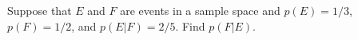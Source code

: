 \documentclass[../main.tex]{subfiles}
\begin{document}
Suppose that $E$ and $F$ are events in a sample space and $p(E) = 1/3$, $p(F) = 1/2$, and $p(E|F) = 2/5$. Find $p(F|E)$.

\solution
\end{document}
